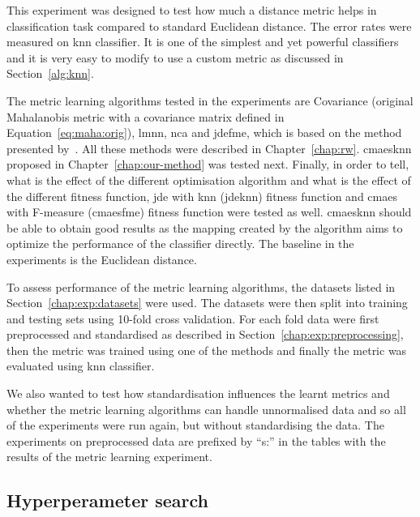 \documentclass[12pt,a4paper]{report}
\begin{document}
This experiment was designed to test how much a distance metric helps in classification task compared to standard Euclidean distance. The error rates were measured on \ac{knn} classifier. It is one of the simplest and yet powerful classifiers and it is very easy to modify to use a custom metric as discussed in Section~\ref{alg:knn}.

The metric learning algorithms tested in the experiments are Covariance (original Mahalanobis metric with a covariance matrix defined in Equation~\ref{eq:maha:orig}), \ac{lmnn}, \ac{nca} and \ac{jdefme}, which is based on the method presented by~\citep{fukui2013evolutionary}. All these methods were described in Chapter~\ref{chap:rw}. \ac{cmaesknn} proposed in Chapter~\ref{chap:our-method} was tested next. Finally, in order to tell, what is the effect of the different optimisation algorithm and what is the effect of the different fitness function, \ac{jde} with \ac{knn} (\ac{jdeknn}) fitness function and \ac{cmaes} with F-measure (\ac{cmaesfme}) fitness function were tested as well. \ac{cmaesknn} should be able to obtain good results as the mapping created by the algorithm aims to optimize the performance of the classifier directly. The baseline in the experiments is the Euclidean distance.

To assess performance of the metric learning algorithms, the datasets listed in Section~\ref{chap:exp:datasets} were used. The datasets were then split into training and testing sets using 10-fold cross validation. For each fold data were first preprocessed and standardised as described in Section~\ref{chap:exp:preprocessing}, then the metric was trained using one of the methods and finally the metric was evaluated using \ac{knn} classifier.

We also wanted to test how standardisation influences the learnt metrics and whether the metric learning algorithms can handle unnormalised data and so all of the experiments were run again, but without standardising the data. The experiments on preprocessed data are prefixed by ``s:'' in the tables with the results of the metric learning experiment.

\subsection{Hyperperameter search} \label{chap:exp:hypsearch}
\end{document}
